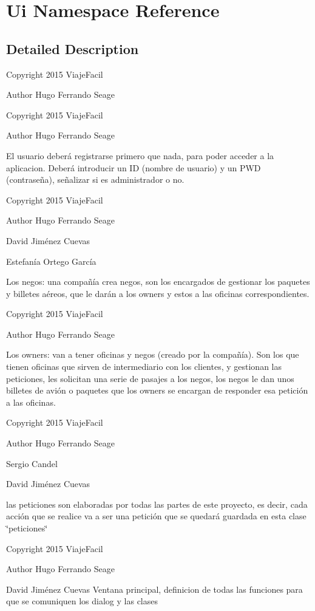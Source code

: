 \hypertarget{namespaceUi}{}\section{Ui Namespace Reference}
\label{namespaceUi}


\subsection{Detailed Description}
Copyright 2015 Viaje\+Facil \begin{DoxyAuthor}{Author}
Hugo Ferrando Seage
\end{DoxyAuthor}
Copyright 2015 Viaje\+Facil \begin{DoxyAuthor}{Author}
Hugo Ferrando Seage
\end{DoxyAuthor}
El usuario deberá registrarse primero que nada, para poder acceder a la aplicacion. Deberá introducir un I\+D (nombre de usuario) y un P\+W\+D (contraseña), señalizar si es administrador o no.

Copyright 2015 Viaje\+Facil \begin{DoxyAuthor}{Author}
Hugo Ferrando Seage 

David Jiménez Cuevas 

Estefanía Ortego García
\end{DoxyAuthor}
Los negos\+: una compañía crea negos, son los encargados de gestionar los paquetes y billetes aéreos, que le darán a los owners y estos a las oficinas correspondientes.

Copyright 2015 Viaje\+Facil \begin{DoxyAuthor}{Author}
Hugo Ferrando Seage
\end{DoxyAuthor}
Los owners\+: van a tener oficinas y negos (creado por la compañía). Son los que tienen oficinas que sirven de intermediario con los clientes, y gestionan las peticiones, les solicitan una serie de pasajes a los negos, los negos le dan unos billetes de avión o paquetes que los owners se encargan de responder esa petición a las oficinas.

Copyright 2015 Viaje\+Facil \begin{DoxyAuthor}{Author}
Hugo Ferrando Seage 

Sergio Candel 

David Jiménez Cuevas
\end{DoxyAuthor}
las peticiones son elaboradas por todas las partes de este proyecto, es decir, cada acción que se realice va a ser una petición que se quedará guardada en esta clase \char`\"{}peticiones\char`\"{}

Copyright 2015 Viaje\+Facil \begin{DoxyAuthor}{Author}
Hugo Ferrando Seage 

David Jiménez Cuevas Ventana principal, definicion de todas las funciones para que se comuniquen los dialog y las clases 
\end{DoxyAuthor}
